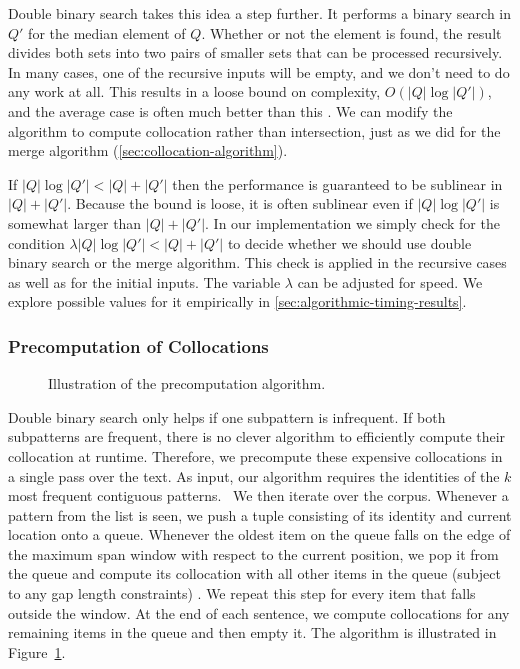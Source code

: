 Double binary search takes this idea a step further.  
It performs a binary search in $Q'$ for the median
element of $Q$.  Whether or not the element is found,
the result divides both sets into two pairs of smaller sets that
can be processed recursively.  In many cases, one of the
recursive inputs will be empty, and we don't need to
do any work at all.  This results in a loose
bound on complexity, $O(|Q| \log |Q'|)$, and the
average case is often much better than this
\citep{Baeza-Yates:2004:cpm,baeza-yates:2005:spire}.
We can modify the algorithm to compute collocation rather 
than intersection, just as we did for the merge
algorithm (\textsection\ref{sec:collocation-algorithm}).

If $|Q| \log |Q'| < |Q| + |Q'|$ then the performance
is guaranteed to be sublinear in $|Q| + |Q'|$.  Because the 
bound is loose, it is often sublinear
even if $|Q| \log |Q'|$ is somewhat larger than $|Q| + |Q'|$.
In our implementation we simply
check for the condition  $\lambda |Q| \log |Q'| < |Q| + |Q'|$ to decide
whether we should use double binary search or the merge algorithm.
This check is applied in the recursive cases as well as for the 
initial inputs.  The variable $\lambda$ can be adjusted
for speed.  We explore possible values for it empirically in 
\textsection\ref{sec:algorithmic-timing-results}.

\subsubsection{Precomputation of Collocations}\label{sec:precomputation}

\figpreamble
\begin{figure}
	\figfontsize{
	\begin{center}
		
	\end{center}}
	\figpostamble
	\caption{Illustration of the precomputation algorithm.}
	\label{fig:precomputation-algorithm}
\end{figure}

Double binary search only helps if one subpattern is infrequent.
If both subpatterns are frequent, there is no clever algorithm
to efficiently compute their collocation at runtime.  Therefore, we
precompute these expensive collocations
in a single pass over the text.  As input, our algorithm requires the 
identities of the $k$ most frequent contiguous patterns.~
We then iterate over the corpus.  Whenever a pattern from the 
list is seen, we push a tuple consisting of its identity and 
current location onto a queue.  Whenever 
the oldest item on the queue falls on the edge of the 
maximum span window with respect to the current 
position, we pop it from the queue and compute its
collocation with all other items in the queue (subject to any gap
length constraints) .  We repeat this step for every item 
that falls outside the window.  At the end of each
sentence, we compute collocations for any remaining
items in the queue and then empty it.  The algorithm is
illustrated in Figure~\ref{fig:precomputation-algorithm}.

